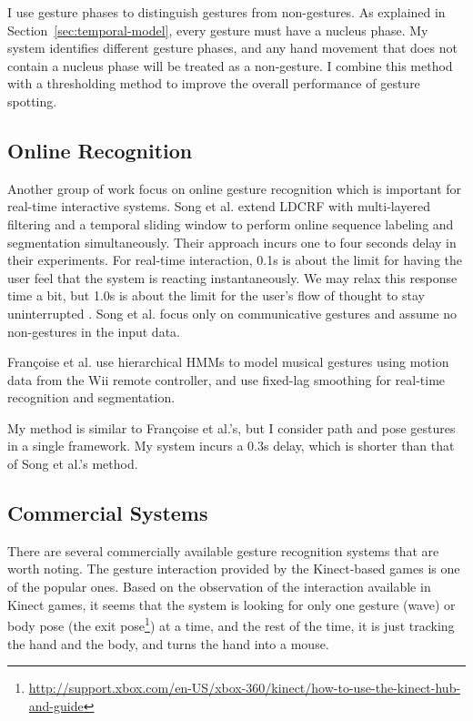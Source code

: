 I use gesture phases to distinguish gestures from non-gestures. As explained in
Section~\ref{sec:temporal-model}, every gesture must have a nucleus phase.
My system identifies different gesture phases, and any hand movement that does
not contain a nucleus phase will be treated as a non-gesture. I combine this
method with a thresholding method to improve the overall performance of gesture
spotting.

\subsection{Online Recognition}
Another group of work focus on online gesture recognition which is important
for real-time interactive systems. Song et al.
\cite{song12} extend LDCRF with multi-layered filtering and a temporal sliding window to perform online sequence labeling and
segmentation simultaneously.
Their approach incurs one to four seconds delay in their
experiments. For real-time interaction, 0.1s is about the limit for having the
user feel that the system is reacting instantaneously. We may relax this response time a
bit, but 1.0s is about the limit for the user's flow of thought to stay
uninterrupted \cite{card91}.  Song et al. focus only on communicative
gestures and assume no non-gestures in the input data. 

Fran{\c{c}}oise et al. \cite{francoise11} use hierarchical HMMs to model musical
gestures using motion data from the Wii remote controller, and use fixed-lag
smoothing for real-time recognition and segmentation.

My method is similar to Fran{\c{c}}oise et al.'s, but I consider path and pose
gestures in a single framework. My system incurs a 0.3s delay, which is shorter
than that of Song et al.'s method.

\subsection{Commercial Systems}
There are several commercially available gesture recognition systems that
are worth noting. 
The gesture interaction provided by the Kinect-based games is
one of the popular ones. Based on the observation of the interaction
available in Kinect games, it seems that the system is looking for only one
gesture (wave) or body pose (the exit
pose\footnote{\url{http://support.xbox.com/en-US/xbox-360/kinect/how-to-use-the-kinect-hub-and-guide}}) at a time, and the rest of the time, 
it is just tracking the hand and the body, and turns the hand into a mouse.

